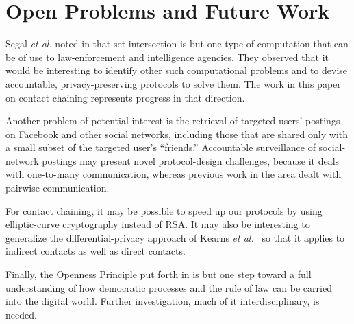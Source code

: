 \section{Open Problems and Future Work}\label{sec-future}
Segal {\it et al.} noted in \cite[Section 6.1]{sff-foci2014} that
set intersection is but one type of computation that can be of use
to law-enforcement and intelligence agencies.  They observed that it 
would be interesting to identify other such computational problems 
and to devise accountable, privacy-preserving protocols to solve them.  
The work in this paper on contact chaining represents progress in that
direction.  

Another problem of potential interest is the retrieval of
targeted users' postings on Facebook and other social networks, including 
those that are shared only with a small subset of the targeted user's 
``friends.'' Accountable surveillance of social-network postings may present 
novel protocol-design challenges, because it deals with one-to-many 
communication, whereas previous work in the area dealt with pairwise 
communication.

For contact chaining, it may be possible to speed up our protocols by using
elliptic-curve cryptography instead of RSA.  It may also be interesting to 
generalize the differential-privacy approach of Kearns {\it et 
al.}~\cite{krwy-pnas16} so that it applies to indirect contacts as well as
direct contacts. 

Finally, the Openness Principle put forth in \cite{sff-foci2014} is but one step
toward a full understanding of how democratic processes and the rule of law
can be carried into the digital world.  Further investigation, much of it
interdisciplinary, is needed.

